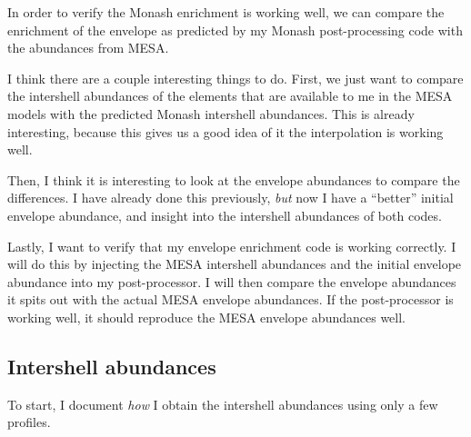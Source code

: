 \documentclass[a4paper,10pt]{article}
\begin{document}

In order to verify the Monash enrichment is working well, we can compare the enrichment of the envelope as predicted by my Monash post-processing code with the abundances from MESA.

I think there are a couple interesting things to do. First, we just want to compare the intershell abundances of the elements that are available to me in the MESA models with the
predicted Monash intershell abundances. This is already interesting, because this gives us a good idea of it the interpolation is working well.

Then, I think it is interesting to look at the envelope abundances to compare the differences. I have already done this previously, \emph{but} now I have a ``better'' initial envelope abundance, and insight into the intershell abundances of both codes.

Lastly, I want to verify that my envelope enrichment code is working correctly. I will do this by injecting the MESA intershell abundances and the initial envelope abundance into
my post-processor. I will then compare the envelope abundances it spits out with the actual MESA envelope abundances. If the post-processor is working well, it should reproduce the
MESA envelope abundances well.

\subsection{Intershell abundances}

To start, I document \emph{how} I obtain the intershell abundances using only a few profiles. 
\begin{figure}[ht]
    \centering
\end{figure}
\end{document}
